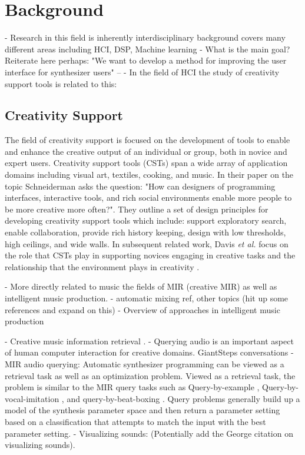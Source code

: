 \chapter{Background}
\label{chapter:background}
- Research in this field is inherently interdisciplinary background covers many different areas including HCI, DSP, Machine learning
- What is the main goal? Reiterate here perhaps: "We want to develop a method for improving the user interface for synthesizer users" -- 
- In the field of HCI the study of creativity support tools is related to this:

\section{Creativity Support}
The field of creativity support is focused on the development of tools to enable and enhance the creative output of an individual or group, both in novice and expert users. Creativity support tools (CSTs) \cite{shneiderman2007creativity} span a wide array of application domains including visual art, textiles, cooking, and music. In their paper on the topic Schneiderman asks the question: "How can designers of programming interfaces, interactive tools, and rich social environments enable more people to be more creative more often?". They outline a set of design principles for developing creativity support tools which include: support exploratory search, enable collaboration, provide rich history keeping, design with low thresholds, high ceilings, and wide walls. In subsequent related work, Davis \textit{et al.} focus on the role that CSTs play in supporting novices engaging in creative tasks and the relationship that the environment plays in creativity \cite{davis2013toward}.

- More directly related to music the fields of MIR (creative MIR) as well as intelligent music production. - automatic mixing ref, other topics (hit up some references and expand on this)
- Overview of approaches in intelligent music production \cite{moffat2019approaches}

- Creative music information retrieval \cite{humphrey2013brief}. 
- Querying audio is an important aspect of human computer interaction for creative domains. GiantSteps conversations
- MIR audio querying: Automatic synthesizer programming can be viewed as a retrieval task as well as an optimization problem. Viewed as a retrieval task, the problem is similar to the MIR query tasks such as Query-by-example \cite{zloof1977query}, Query-by-vocal-imitation \cite{blancas2014sound}, and query-by-beat-boxing \cite{kapur2004query}. Query problems generally build up a model of the synthesis parameter space and then return a parameter setting based on a classification that attempts to match the input with the best parameter setting.
- Visualizing sounds: \cite{wessel1979timbre} (Potentially add the George citation on visualizing sounds).

